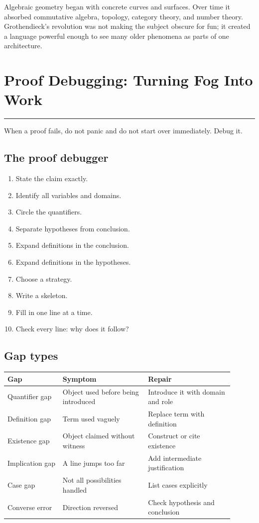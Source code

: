 \documentclass[12pt]{article}
\newcommand{\chapterline}{\vspace{0.4em}\hrule\vspace{0.8em}}
\begin{document}
\begin{historybox}
Algebraic geometry began with concrete curves and surfaces. Over time it absorbed commutative algebra, topology, category theory, and number theory. Grothendieck's revolution was not making the subject obscure for fun; it created a language powerful enough to see many older phenomena as parts of one architecture.
\end{historybox}

\newpage
\section{Proof Debugging: Turning Fog Into Work}
\chapterline

When a proof fails, do not panic and do not start over immediately. Debug it.

\subsection{The proof debugger}

\begin{enumerate}
\item State the claim exactly.
\item Identify all variables and domains.
\item Circle the quantifiers.
\item Separate hypotheses from conclusion.
\item Expand definitions in the conclusion.
\item Expand definitions in the hypotheses.
\item Choose a strategy.
\item Write a skeleton.
\item Fill in one line at a time.
\item Check every line: why does it follow?
\end{enumerate}

\subsection{Gap types}

\begin{longtable}{p{0.22\linewidth}p{0.34\linewidth}p{0.34\linewidth}}
\toprule
Gap & Symptom & Repair \\
\midrule
Quantifier gap & Object used before being introduced & Introduce it with domain and role \\
Definition gap & Term used vaguely & Replace term with definition \\
Existence gap & Object claimed without witness & Construct or cite existence \\
Implication gap & A line jumps too far & Add intermediate justification \\
Case gap & Not all possibilities handled & List cases explicitly \\
Converse error & Direction reversed & Check hypothesis and conclusion \\
\bottomrule
\end{longtable}
\end{document}
